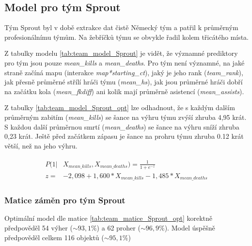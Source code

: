 

\subsection{Model pro tým Sprout}
Tým Sprout byl v době extrakce dat čistě Německý tým a patřil k průměrným profesionálnímu týmům. Na žebříčků týmu se obvykle řadil kolem třicátého místa.



Z tabulky modelu \ref{tab:team_model_Sprout} je vidět, že významné prediktory pro tým jsou pouze \textit{mean\_kills} a \textit{mean\_deaths}. Pro tým není významné,
na jaké straně začíná mapu (interakce \textit{map*starting\_ct}), jaký je jeho rank (\textit{team\_rank}), jak přesně průměrné střílí hráči týmu (\textit{mean\_hs}),
jak jsou průměrné hráči dobří na začátku kola (\textit{mean\_fkdiff}) ani kolik mají průměrně asistencí (\textit{mean\_assists}).



Z tabulky \ref{tab:team_model_Sprout_opt} lze odhadnout, že s každým dalším průměrným zabitím (\textit{mean\_kills}) se šance na výhru týmu zvýší zhruba 4,95 krát.
S každou další průměrnou smrtí (\textit{mean\_deaths}) se šance na výhru sníží zhruba 0,23 krát. Ještě před začátkem zápasu je šance na prohru týmu
zhruba 0.12 krát větší, než na jeho výhru.

\begin{align*}
    \begin{split}
        P(1 | &X_{mean\_kills},  X_{mean\_deaths}) = \frac{1}{1 + e^{-z}} \\
        z = &-2,098 + 1,600*X_{mean\_kills} - 1,485*X_{mean\_deaths}
    \end{split}
\end{align*}

\subsubsection{Matice záměn pro tým Sprout}



Optimální model dle matice \ref{tab:team_matice_Sprout_opt} korektně předpověděl 54 výher ($\sim 93,1 \%$) a 62 proher ($\sim 96,9 \%$). Model úspěšně předpověděl
celkem 116 objektů ($\sim 95,1 \%$)



